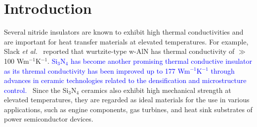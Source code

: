 \documentclass[twocolumn,amsmath,amssymb,a4paper,prb,superscriptaddress,floatfix]{revtex4-1}
\begin{document}
\maketitle

\section{Introduction}
Several nitride insulators are known to exhibit high thermal conductivities and
are important for heat transfer materials at elevated temperatures. For
example, Slack {\it et al.}~\cite{slack} reported that wurtzite-type w-AlN has
thermal conductivity of $\gg$  100 Wm$^{-1}$K$^{-1}$. \textcolor{blue}{Si$_3$N$_4$ has become
another promising thermal conductive insulator as its thremal conductivity has
been improved up to 177 Wm$^{-1}$K$^{-1}$ through advances in ceramic
technologies related to the densification and microstructure
control.~\cite{zhou,hirao-rev,watari,hirosaki}} Since the Si$_3$N$_4$ ceramics also
exhibit high mechanical strength at elevated temperatures, they are
regarded as ideal materials for the use in various applications, such as
engine components, gas turbines, and heat sink substrates of power
semiconductor devices.
\end{document}
